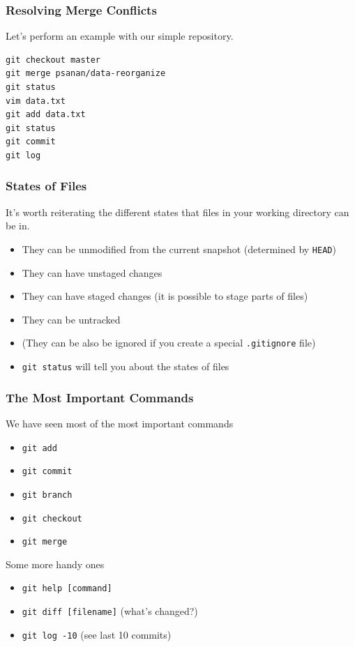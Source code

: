\documentclass{beamer}
\begin{document}
\begin{frame}[fragile]
\frametitle{Resolving Merge Conflicts}
Let's perform an example with our simple repository.
\begin{lstlisting}
git checkout master
git merge psanan/data-reorganize
git status
vim data.txt
git add data.txt
git status
git commit
git log
\end{lstlisting}
\end{frame}

\begin{frame}[fragile]
\frametitle{States of Files}
It's worth reiterating the different states that files in your working directory can be in.
\begin{itemize}
\item They can be unmodified from the current snapshot (determined by \texttt{HEAD})
\item They can have unstaged changes
\item They can have staged changes (it is possible to stage parts of files)
\item They can be untracked
\item (They can be also be ignored if you create a special \texttt{.gitignore} file)
\item \lstinline{git status} will tell you about the states of files
\end{itemize}
\end{frame}

\begin{frame}[fragile]
\frametitle{The Most Important Commands}
We have seen most of the most important commands
\begin{itemize}
\item \lstinline{git add}
\item \lstinline{git commit}
\item \lstinline{git branch}
\item \lstinline{git checkout}
\item \lstinline{git merge}
\end{itemize}

Some more handy ones
\begin{itemize}
\item \lstinline{git help [command]}
\item \lstinline{git diff [filename]} (what's changed?)
\item \lstinline{git log -10} (see last 10 commits)
\end{itemize}
\end{frame}
\end{document}
